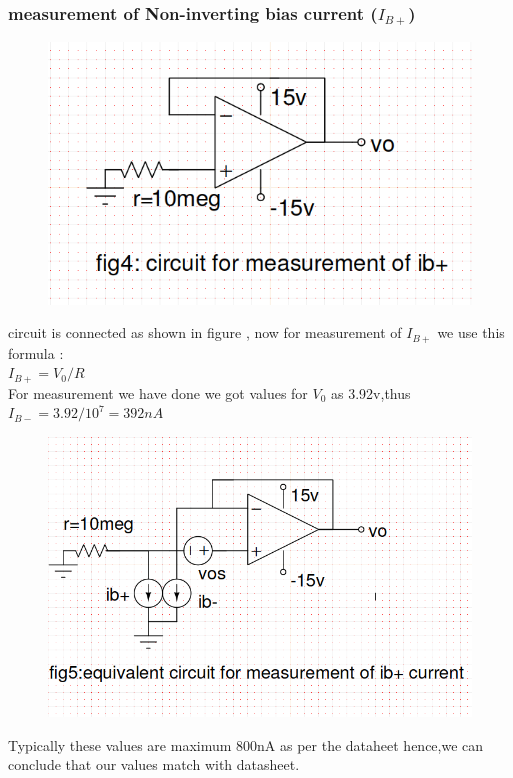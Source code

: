 \documentclass[12pt]{article}
\begin{document}
\subsubsection{ measurement of Non-inverting bias current (\(I_{B+}\))}
\begin{figure}[h!]
\centering
\includegraphics[scale = 0.5]{q1_c_cir.png}
\end{figure}
circuit is connected as shown in figure , now for measurement of \(I_{B+}\) we use this formula :\\
\(I_{B+}=V_{0}/R\)\\
For measurement we have done we got values for \(V_{0}\) as 3.92v,thus\\
\(I_{B-}=3.92/10^{7}=392nA\)\\
\newpage
\begin{figure}[h!]
\centering
\includegraphics[scale = 0.6]{q1c_ib+.png}
\end{figure}
Typically these values are maximum 800nA as per the dataheet hence,we can conclude that our values match with datasheet.
\newpage
\end{document}
